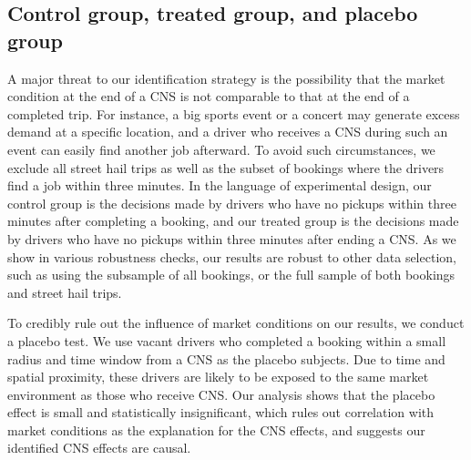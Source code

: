 \documentclass[reviewmode,AEJ]{AEA}
\begin{document}
\subsection{Control group, treated group, and placebo group}
A major threat to our identification strategy is the possibility that the market condition at the end of a CNS is not comparable to that at the end of a completed trip. For instance, a big sports event or a concert may generate excess demand at a specific location, and a driver who receives a CNS during such an event can easily find another job afterward.
To avoid such circumstances, 
we exclude all street hail trips as well as the subset of bookings where the drivers find a job within three minutes. In the language of experimental design, our control group is the decisions made by drivers who have no pickups within three minutes after completing a booking, and our treated group is the decisions made by drivers who have no pickups within three minutes after ending a CNS. As we show in various robustness checks, our results are robust to other data selection, such as using the subsample of all bookings, or the full sample of both bookings and street hail trips.%

To credibly rule out the influence of market conditions on our results, we conduct a placebo test. We use vacant drivers who completed a booking within a small radius and time window from a CNS as the placebo subjects. Due to time and spatial proximity, these drivers are likely to be exposed to the same market environment as those who receive CNS.
Our analysis shows that the placebo effect is small and statistically insignificant, which rules out correlation with market conditions as the explanation for the CNS effects, and suggests our identified CNS effects are causal.
\end{document}

